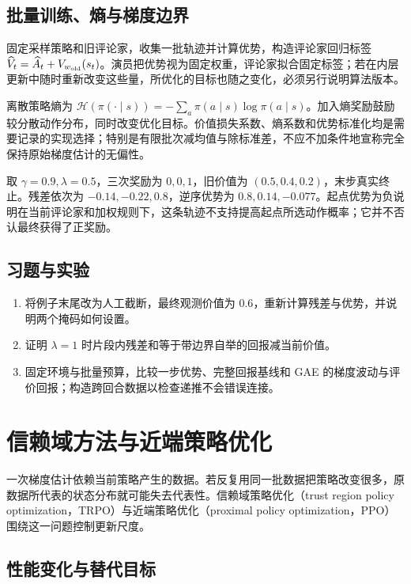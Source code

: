 \documentclass[UTF8,12pt,a4paper,fontset=fandol]{ctexbook}
\begin{document}
\section{批量训练、熵与梯度边界}

固定采样策略和旧评论家，收集一批轨迹并计算优势，构造评论家回归标签 $\widehat V_t=\widehat A_t+V_{w_{\rm old}}(s_t)$。演员把优势视为固定权重，评论家拟合固定标签；若在内层更新中随时重新改变这些量，所优化的目标也随之变化，必须另行说明算法版本。

离散策略熵为 $\mathcal H(\pi(\cdot\mid s))=-\sum_a\pi(a\mid s)\log\pi(a\mid s)$。加入熵奖励鼓励较分散动作分布，同时改变优化目标。价值损失系数、熵系数和优势标准化均是需要记录的实现选择；特别是有限批次减均值与除标准差，不应不加条件地宣称完全保持原始梯度估计的无偏性。

\begin{example}[三步 GAE]
取 $\gamma=0.9,\lambda=0.5$，三次奖励为 $0,0,1$，旧价值为 $(0.5,0.4,0.2)$，末步真实终止。残差依次为 $-0.14,-0.22,0.8$，逆序优势为 $0.8,0.14,-0.077$。起点优势为负说明在当前评论家和加权规则下，这条轨迹不支持提高起点所选动作概率；它并不否认最终获得了正奖励。
\end{example}

\section{习题与实验}
\begin{enumerate}
\item 将例子末尾改为人工截断，最终观测价值为 $0.6$，重新计算残差与优势，并说明两个掩码如何设置。
\item 证明 $\lambda=1$ 时片段内残差和等于带边界自举的回报减当前价值。
\item 固定环境与批量预算，比较一步优势、完整回报基线和 GAE 的梯度波动与评价回报；构造跨回合数据以检查递推不会错误连接。
\end{enumerate}

\chapter{信赖域方法与近端策略优化}
\label{ch:rl-ppo}

一次梯度估计依赖当前策略产生的数据。若反复用同一批数据把策略改变很多，原数据所代表的状态分布就可能失去代表性。信赖域策略优化（trust region policy optimization，TRPO）与近端策略优化（proximal policy optimization，PPO）围绕这一问题控制更新尺度\cite{schulman-trpo,schulman-ppo}。

\section{性能变化与替代目标}
\end{document}
